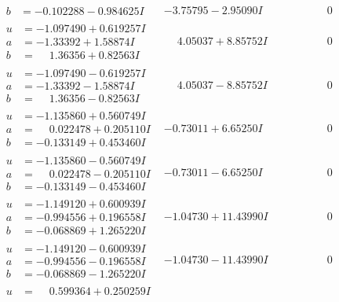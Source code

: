 \documentclass[1p]{elsarticle_modified}
\theoremstyle{definition}
\begin{document}
$$\begin{array}{c|c|c}
\begin{aligned}
b &= -0.102288 - 0.984625 I\end{aligned}
 & -3.75795 - 2.95090 I & \phantom{-0.000000 } 0 \\ \hline\begin{aligned}
u &= -1.097490 + 0.619257 I \\
a &= -1.33392 + 1.58874 I \\
b &= \phantom{-}1.36356 + 0.82563 I\end{aligned}
 & \phantom{-}4.05037 + 8.85752 I & \phantom{-0.000000 } 0 \\ \hline\begin{aligned}
u &= -1.097490 - 0.619257 I \\
a &= -1.33392 - 1.58874 I \\
b &= \phantom{-}1.36356 - 0.82563 I\end{aligned}
 & \phantom{-}4.05037 - 8.85752 I & \phantom{-0.000000 } 0 \\ \hline\begin{aligned}
u &= -1.135860 + 0.560749 I \\
a &= \phantom{-}0.022478 + 0.205110 I \\
b &= -0.133149 + 0.453460 I\end{aligned}
 & -0.73011 + 6.65250 I & \phantom{-0.000000 } 0 \\ \hline\begin{aligned}
u &= -1.135860 - 0.560749 I \\
a &= \phantom{-}0.022478 - 0.205110 I \\
b &= -0.133149 - 0.453460 I\end{aligned}
 & -0.73011 - 6.65250 I & \phantom{-0.000000 } 0 \\ \hline\begin{aligned}
u &= -1.149120 + 0.600939 I \\
a &= -0.994556 + 0.196558 I \\
b &= -0.068869 + 1.265220 I\end{aligned}
 & -1.04730 + 11.43990 I & \phantom{-0.000000 } 0 \\ \hline\begin{aligned}
u &= -1.149120 - 0.600939 I \\
a &= -0.994556 - 0.196558 I \\
b &= -0.068869 - 1.265220 I\end{aligned}
 & -1.04730 - 11.43990 I & \phantom{-0.000000 } 0 \\ \hline\begin{aligned}
u &= \phantom{-}0.599364 + 0.250259 I \\

\end{aligned}
\end{array}$$
\end{document}

